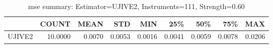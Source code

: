 \begin{table}[ht]
\centering
\caption{mse summary: Estimator=UJIVE2, Instruments=111, Strength=0.60}
\begin{tabular}{lrrrrrrrr}
\toprule
 & COUNT & MEAN & STD & MIN & 25\% & 50\% & 75\% & MAX \\
\midrule
UJIVE2 & 10.0000 & 0.0070 & 0.0053 & 0.0016 & 0.0041 & 0.0059 & 0.0078 & 0.0206 \\
\bottomrule
\end{tabular}
\end{table}

